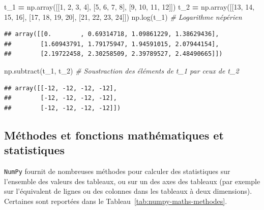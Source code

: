 \documentclass[
  12pt,
]{book}
\newenvironment{Shaded}{\begin{snugshade}}{\end{snugshade}}
\newcommand{\CommentTok}[1]{\textcolor[rgb]{0.56,0.35,0.01}{\textit{#1}}}
\newcommand{\DecValTok}[1]{\textcolor[rgb]{0.00,0.00,0.81}{#1}}
\newcommand{\NormalTok}[1]{#1}
\newcommand{\OperatorTok}[1]{\textcolor[rgb]{0.81,0.36,0.00}{\textbf{#1}}}
\numberwithin{equation}{section}
\numberwithin{countremarque}{section}
\begin{document}
\begin{Shaded}
\begin{Highlighting}[]
\NormalTok{t\_1 }\OperatorTok{=}\NormalTok{ np.array([[}\DecValTok{1}\NormalTok{, }\DecValTok{2}\NormalTok{, }\DecValTok{3}\NormalTok{, }\DecValTok{4}\NormalTok{], [}\DecValTok{5}\NormalTok{, }\DecValTok{6}\NormalTok{, }\DecValTok{7}\NormalTok{, }\DecValTok{8}\NormalTok{], [}\DecValTok{9}\NormalTok{, }\DecValTok{10}\NormalTok{, }\DecValTok{11}\NormalTok{, }\DecValTok{12}\NormalTok{]])}
\NormalTok{t\_2 }\OperatorTok{=}\NormalTok{ np.array([[}\DecValTok{13}\NormalTok{, }\DecValTok{14}\NormalTok{, }\DecValTok{15}\NormalTok{, }\DecValTok{16}\NormalTok{], [}\DecValTok{17}\NormalTok{, }\DecValTok{18}\NormalTok{, }\DecValTok{19}\NormalTok{, }\DecValTok{20}\NormalTok{], [}\DecValTok{21}\NormalTok{, }\DecValTok{22}\NormalTok{, }\DecValTok{23}\NormalTok{, }\DecValTok{24}\NormalTok{]])}
\NormalTok{np.log(t\_1) }\CommentTok{\# Logarithme népérien}
\end{Highlighting}
\end{Shaded}

\begin{lstlisting}
## array([[0.        , 0.69314718, 1.09861229, 1.38629436],
##        [1.60943791, 1.79175947, 1.94591015, 2.07944154],
##        [2.19722458, 2.30258509, 2.39789527, 2.48490665]])
\end{lstlisting}

\begin{Shaded}
\begin{Highlighting}[]
\NormalTok{np.subtract(t\_1, t\_2) }\CommentTok{\# Soustraction des éléments de t\_1 par ceux de t\_2}
\end{Highlighting}
\end{Shaded}

\begin{lstlisting}
## array([[-12, -12, -12, -12],
##        [-12, -12, -12, -12],
##        [-12, -12, -12, -12]])
\end{lstlisting}

\subsection{Méthodes et fonctions mathématiques et statistiques}\label{muxe9thodes-et-fonctions-mathuxe9matiques-et-statistiques}

\texttt{NumPy} fournit de nombreuses méthodes pour calculer des statistiques sur l'ensemble des valeurs des tableaux, ou sur un des axes des tableaux (par exemple sur l'équivalent de lignes ou des colonnes dans les tableaux à deux dimensions). Certaines sont reportées dans le Tableau~\ref{tab:numpy-maths-methodes}.
\end{document}
